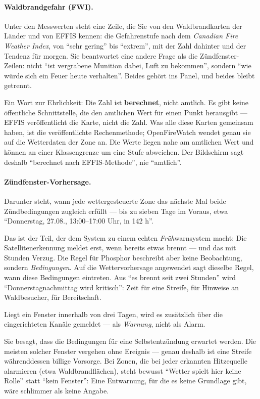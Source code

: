 \documentclass[11pt,a4paper,DIV=12,parskip=half]{scrartcl}
\begin{document}
\paragraph{Waldbrandgefahr (FWI).} Unter den Messwerten steht eine Zeile, die
Sie von den Waldbrandkarten der Länder und von EFFIS kennen: die
Gefahrenstufe nach dem \emph{Canadian Fire Weather Index}, von \enquote{sehr
gering} bis \enquote{extrem}, mit der Zahl dahinter und der Tendenz für morgen.
Sie beantwortet eine andere Frage als die Zündfenster-Zeilen: nicht
\enquote{ist vergrabene Munition dabei, Luft zu bekommen}, sondern
\enquote{wie würde sich ein Feuer heute verhalten}. Beides gehört ins Panel,
und beides bleibt getrennt.

Ein Wort zur Ehrlichkeit: Die Zahl ist \textbf{berechnet}, nicht amtlich. Es
gibt keine öffentliche Schnittstelle, die den amtlichen Wert für einen Punkt
herausgibt --- EFFIS veröffentlicht die Karte, nicht die Zahl. Was alle diese
Karten gemeinsam haben, ist die veröffentlichte Rechenmethode; OpenFireWatch
wendet genau sie auf die Wetterdaten der Zone an. Die Werte liegen nahe am
amtlichen Wert und können an einer Klassengrenze um eine Stufe abweichen. Der
Bildschirm sagt deshalb \enquote{berechnet nach EFFIS-Methode}, nie
\enquote{amtlich}.

\paragraph{Zündfenster-Vorhersage.} Darunter steht, wann jede wettergesteuerte
Zone das nächste Mal beide Zündbedingungen zugleich erfüllt --- bis zu sieben
Tage im Voraus, etwa \enquote{Donnerstag, 27.08., 13:00--17:00 Uhr, in 142 h}.

Das ist der Teil, der dem System zu einem echten \emph{Früh}warnsystem macht:
Die Satellitenerkennung meldet erst, wenn bereits etwas brennt --- und das mit
Stunden Verzug. Die Regel für Phosphor beschreibt aber keine Beobachtung,
sondern \emph{Bedingungen}. Auf die Wettervorhersage angewendet sagt dieselbe
Regel, wann diese Bedingungen eintreten. Aus \enquote{es brennt seit zwei
Stunden} wird \enquote{Donnerstagnachmittag wird kritisch}: Zeit für eine
Streife, für Hinweise an Waldbesucher, für Bereitschaft.

Liegt ein Fenster innerhalb von drei Tagen, wird es zusätzlich über die
eingerichteten Kanäle gemeldet --- als \emph{Warnung}, nicht als Alarm.

\begin{hinweis}
Sie besagt, dass die Bedingungen für eine Selbstentzündung erwartet werden.
Die meisten solcher Fenster vergehen ohne Ereignis --- genau deshalb ist eine
Streife währenddessen billige Vorsorge. Bei Zonen, die bei jeder erkannten
Hitzequelle alarmieren (etwa Waldbrandflächen), steht bewusst \enquote{Wetter
spielt hier keine Rolle} statt \enquote{kein Fenster}: Eine Entwarnung, für
die es keine Grundlage gibt, wäre schlimmer als keine Angabe.
\end{hinweis}
\end{document}

